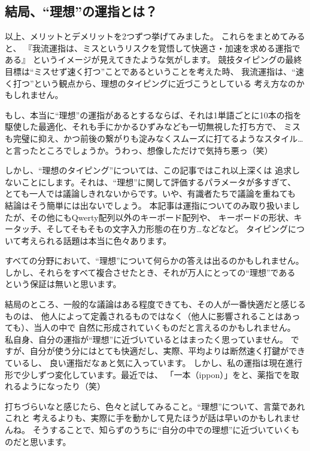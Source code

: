 \subsection{結局、“理想”の運指とは？}

以上、メリットとデメリットを2つずつ挙げてみました。
これらをまとめてみると、
『我流運指は、ミスというリスクを覚悟して快適さ・加速を求める運指である』
というイメージが見えてきたような気がします。
競技タイピングの最終目標は“ミスせず速く打つ”ことであるということを考えた時、
我流運指は、“速く打つ”という観点から、理想のタイピングに近づこうとしている
考え方なのかもしれません。

もし、本当に“理想”の運指があるとするならば、それは1単語ごとに10本の指を
駆使した最適化、それも手にかかるひずみなども一切無視した打ち方で、
ミスも完璧に抑え、かつ前後の繋がりも淀みなくスムーズに打てるようなスタイル…
と言ったところでしょうか。うわっ、想像しただけで気持ち悪っ（笑）


しかし、“理想のタイピング”については、この記事ではこれ以上深くは
追求しないことにします。それは、“理想”に関して評価するパラメータが多すぎて、
とても一人では議論しきれないからです。いや、有識者たちで議論を重ねても
結論はそう簡単には出ないでしょう。
本記事は運指についてのみ取り扱いましたが、その他にもQwerty配列以外のキーボード配列や、
キーボードの形状、キータッチ、そしてそもそもの文字入力形態の在り方…などなど。
タイピングについて考えられる話題は本当に色々あります。

すべての分野において、“理想”について何らかの答えは出るのかもしれません。
しかし、それらをすべて複合させたとき、それが万人にとっての“理想”である
という保証は無いと思います。


結局のところ、一般的な議論はある程度できても、その人が一番快適だと感じるものは、
他人によって定義されるものではなく（他人に影響されることはあっても）、当人の中で
自然に形成されていくものだと言えるのかもしれません。
私自身、自分の運指が“理想”に近づいているとはまったく思っていません。
ですが、自分が使う分にはとても快適だし、実際、平均よりは断然速く打鍵ができているし、
良い運指だなぁと気に入っています。
しかし、私の運指は現在進行形で少しずつ変化しています。最近では、
「一本（ippon）」をと、薬指でを取れるようになったり（笑）


打ちづらいなと感じたら、色々と試してみること。“理想”について、言葉であれこれと
考えるよりも、実際に手を動かして見たほうが話は早いのかもしれませんね。
そうすることで、知らずのうちに“自分の中での理想”に近づいていくものだと思います。



